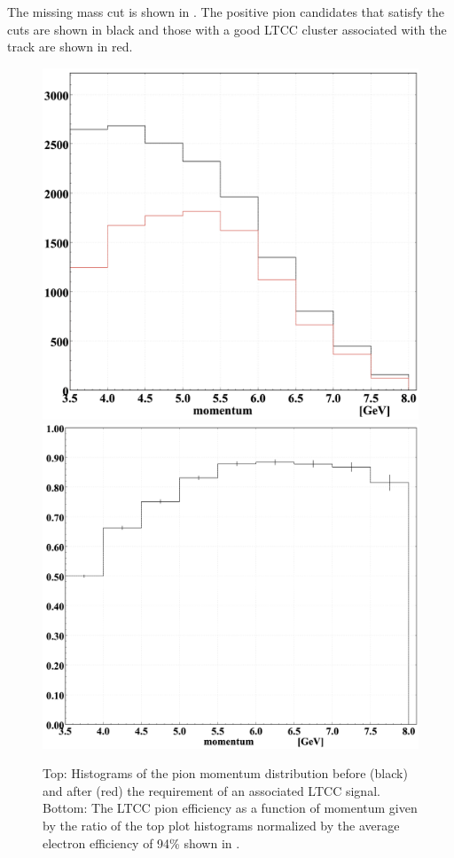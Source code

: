 The missing mass cut is shown in . The positive pion candidates that satisfy the cuts are shown in black
and those with a good LTCC cluster associated with the track are shown in red.

\begin{figure}[H]
	\centering
	\includegraphics[width=0.95\columnwidth, height=0.7\columnwidth]{img/pionMomentum.png}
	\includegraphics[width=0.95\columnwidth, height=0.7\columnwidth]{img/pionEfficiency.png}
	\caption{Top: Histograms of the pion momentum distribution before (black) and after (red) the requirement of
          an associated LTCC signal. Bottom: The LTCC pion efficiency as a function of momentum given by the ratio of
          the top plot histograms normalized by the average electron efficiency of 94\% shown in
          .}
	\label{fig:pionMomentum}
\end{figure}

